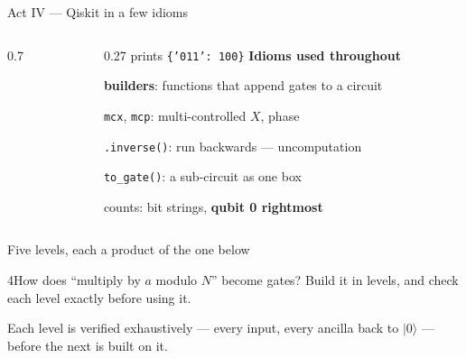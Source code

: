\documentclass[aspectratio=169,11pt]{beamer}
\newcommand{\blocktitle}[1]{{\bfseries #1}\par\vskip1mm}
\newcommand{\code}[2][]{}
\begin{document}
\begin{frame}[fragile]{Act IV --- Qiskit in a few idioms}
  \begin{columns}[T]
    \begin{column}{0.7\textwidth}
      \code[basicstyle=\ttfamily\fontsize{7.8}{9.3}\selectfont]{qiskit_idioms.py}
    \end{column}
    \begin{column}{0.27\textwidth}
      \footnotesize\setlength{\parskip}{3pt}
      prints \texttt{\{'011': 100\}}
      \vskip2mm
      \blocktitle{Idioms used throughout}
      \textbf{builders}: functions that append gates to a circuit\par
      \texttt{mcx}, \texttt{mcp}: multi-controlled $X$, phase\par
      \texttt{.inverse()}: run backwards --- uncomputation\par
      \texttt{to\_gate()}: a sub-circuit as one box\par
      counts: bit strings, \textbf{qubit 0 rightmost}
    \end{column}
  \end{columns}
\end{frame}

\begin{frame}{Five levels, each a product of the one below}
  \begin{difficulty}{4}How does ``multiply by $a$ modulo $N$'' become gates? Build it in levels, and check each level exactly before using it.\end{difficulty}
  \centering
  \begin{takeaway}Each level is verified exhaustively --- every input, every ancilla back to $|0\rangle$ --- before the next is built on it.\end{takeaway}
\end{frame}
\end{document}
